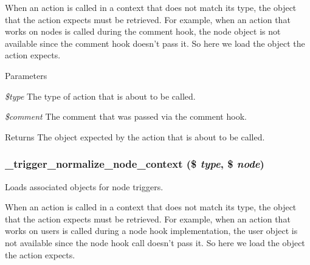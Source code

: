 When an action is called in a context that does not match its type, the object that the action expects must be retrieved. For example, when an action that works on nodes is called during the comment hook, the node object is not available since the comment hook doesn't pass it. So here we load the object the action expects.


\begin{DoxyParams}{Parameters}
\item[{\em \$type}]The type of action that is about to be called. \item[{\em \$comment}]The comment that was passed via the comment hook.\end{DoxyParams}
\begin{DoxyReturn}{Returns}
The object expected by the action that is about to be called. 
\end{DoxyReturn}
\hypertarget{trigger_8module_a49b328cb92ac7d48d13f95946711f35f}{
\subsubsection[{\_\-trigger\_\-normalize\_\-node\_\-context}]{\setlength{\rightskip}{0pt plus 5cm}\_\-trigger\_\-normalize\_\-node\_\-context (\$ {\em type}, \/  \$ {\em node})}}
\label{trigger_8module_a49b328cb92ac7d48d13f95946711f35f}
Loads associated objects for node triggers.

When an action is called in a context that does not match its type, the object that the action expects must be retrieved. For example, when an action that works on users is called during a node hook implementation, the user object is not available since the node hook call doesn't pass it. So here we load the object the action expects.


